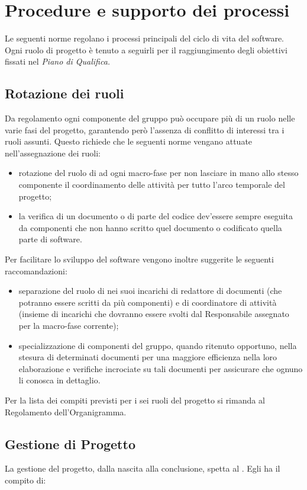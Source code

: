 \section{Procedure e supporto dei processi} \label{procedure}
Le seguenti norme regolano i processi principali del ciclo di vita del software. Ogni ruolo di progetto è tenuto a seguirli per il raggiungimento degli obiettivi fissati nel \textit{Piano di Qualifica.}

\subsection{Rotazione dei ruoli}
Da regolamento\cite{docorganigramma} ogni componente del gruppo può occupare più di un ruolo nelle varie fasi del progetto, garantendo però l'assenza di conflitto di interessi tra i ruoli assunti. Questo richiede che le seguenti norme vengano attuate nell'assegnazione dei ruoli:
\begin{itemize}
\item rotazione del ruolo di \ruoloResponsabile{} ad ogni macro-fase per non lasciare in mano allo stesso componente il coordinamento delle attività per tutto l'arco temporale del progetto;
\item la verifica di un documento o di parte del codice dev'essere sempre eseguita da componenti che non hanno scritto quel documento o codificato quella parte di software.
\end{itemize}
Per facilitare lo sviluppo del software vengono inoltre suggerite le seguenti raccomandazioni:
\begin{itemize}
\item separazione del ruolo di \ruoloResponsabile{} nei suoi incarichi di redattore di documenti (che potranno essere scritti da più componenti) e di coordinatore di attività (insieme di incarichi che dovranno essere svolti dal Responsabile assegnato per la macro-fase corrente);
\item specializzazione di componenti del gruppo, quando ritenuto opportuno, nella stesura di determinati documenti per una maggiore efficienza nella loro elaborazione e verifiche incrociate su tali documenti per assicurare che ognuno li conosca in dettaglio.
\end{itemize}
Per la lista dei compiti previsti per i sei ruoli del progetto si rimanda al Regolamento dell'Organigramma\cite{docorganigramma}.
\subsection{Gestione di Progetto}
La gestione del progetto, dalla nascita alla conclusione, spetta al \ruoloResponsabile . Egli ha il compito di:
